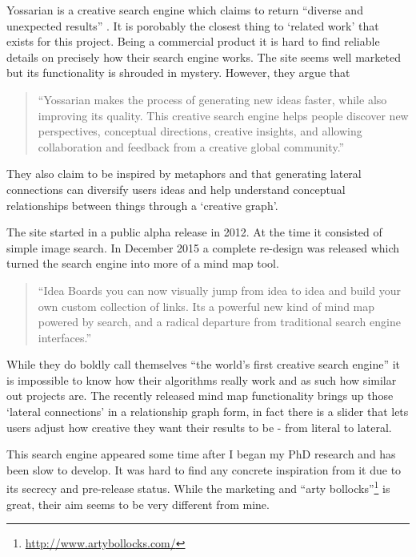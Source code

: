 Yossarian is a creative search engine which claims to return ``diverse and unexpected results'' \autocite{Yossarian2015}. It is porobably the closest thing to `related work' that exists for this project. Being a commercial product it is hard to find reliable details on precisely how their search engine works. The site seems well marketed but its functionality is shrouded in mystery. However, they argue that

\begin{quotation}
  ``Yossarian makes the process of generating new ideas faster, while also improving its quality. This creative search engine helps people discover new perspectives, conceptual directions, creative insights, and allowing collaboration and feedback from a creative global community.'' 
\end{quotation}

They also claim to be inspired by metaphors and that generating lateral connections can diversify users ideas and help understand conceptual relationships between things through a `creative graph'.

The site started in a public alpha release in 2012. At the time it consisted of simple image search. In December 2015 a complete re-design was released \autocite{YossarianEmail} which turned the search engine into more of a mind map tool.

\begin{quotation}
  ``Idea Boards you can now visually jump from idea to idea and build your own custom collection of links. Its a powerful new kind of mind map powered by search, and a radical departure from traditional search engine interfaces.'' 
\end{quotation}

While they do boldly call themselves ``the world's first creative search engine'' \autocite{Yossarian2015} it is impossible to know how their algorithms really work and as such how similar out projects are. The recently released mind map functionality brings up those `lateral connections' in a relationship graph form, in fact there is a slider that lets users adjust how creative they want their results to be - from literal to lateral.

This search engine appeared some time after I began my PhD research and has been slow to develop. It was hard to find any concrete inspiration from it due to its secrecy and pre-release status. While the marketing and ``arty bollocks''\footnote{\url{http://www.artybollocks.com/}} is great, their aim seems to be very different from mine.


